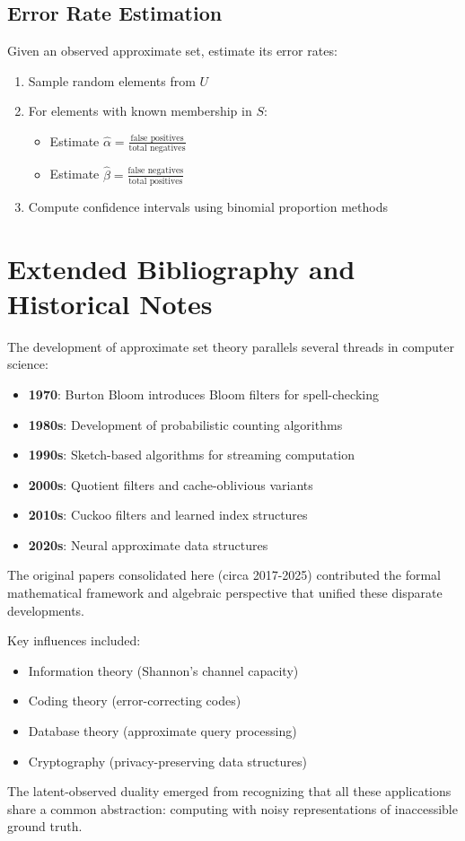 \documentclass[11pt]{article}
\newcommand{\fprate}{\alpha}  %
\newcommand{\fnrate}{\beta}   %
\begin{document}
\subsection{Error Rate Estimation}

Given an observed approximate set, estimate its error rates:

\begin{enumerate}
\item Sample random elements from $U$
\item For elements with known membership in $S$:
\begin{itemize}
\item Estimate $\hat{\fprate} = \frac{\text{false positives}}{\text{total negatives}}$
\item Estimate $\hat{\fnrate} = \frac{\text{false negatives}}{\text{total positives}}$
\end{itemize}
\item Compute confidence intervals using binomial proportion methods
\end{enumerate}

\section{Extended Bibliography and Historical Notes}
\label{app:history}

The development of approximate set theory parallels several threads in computer science:

\begin{itemize}
\item \textbf{1970}: Burton Bloom introduces Bloom filters for spell-checking
\item \textbf{1980s}: Development of probabilistic counting algorithms
\item \textbf{1990s}: Sketch-based algorithms for streaming computation
\item \textbf{2000s}: Quotient filters and cache-oblivious variants
\item \textbf{2010s}: Cuckoo filters and learned index structures
\item \textbf{2020s}: Neural approximate data structures
\end{itemize}

The original papers consolidated here (circa 2017-2025) contributed the formal mathematical framework and algebraic perspective that unified these disparate developments.

Key influences included:
\begin{itemize}
\item Information theory (Shannon's channel capacity)
\item Coding theory (error-correcting codes)
\item Database theory (approximate query processing)
\item Cryptography (privacy-preserving data structures)
\end{itemize}

The latent-observed duality emerged from recognizing that all these applications share a common abstraction: computing with noisy representations of inaccessible ground truth.
\end{document}
